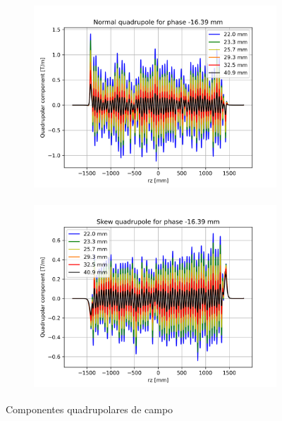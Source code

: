 \documentclass[a4paper,12pt]{article}
\begin{document}
\begin{figure}[H]
\begin{subfigure}{0.5\textwidth}
\includegraphics[width=0.9\linewidth, height=7cm]{figs/phase-16 Normal quadrupole.png} 
\label{fig:subim1-16q}
\end{subfigure}
\begin{subfigure}{0.5\textwidth}
\includegraphics[width=0.9\linewidth, height=7cm]{figs/phase-16 Skew quadrupole.png}
\label{fig:subim2-16q}
\end{subfigure}
\caption{Componentes quadrupolares de campo}
\label{fig:quad-16}
\end{figure}
\end{document}
